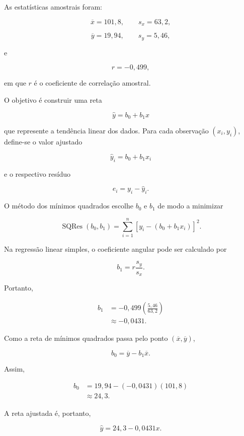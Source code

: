 \documentclass[
  letterpaper,
  DIV=11,
  numbers=noendperiod]{scrreprt}
\begin{document}
As estatísticas amostrais foram:

\[\overline{x}=101{,}8,
\qquad
s_x=63{,}2,\]

\[\overline{y}=19{,}94,
\qquad
s_y=5{,}46,\]

e

\[r=-0{,}499,\]

em que \(r\) é o coeficiente de correlação amostral.

O objetivo é construir uma reta

\[\widehat y=b_0+b_1x\]

que represente a tendência linear dos dados. Para cada observação
\((x_i,y_i)\), define-se o valor ajustado

\[\widehat y_i=b_0+b_1x_i\]

e o respectivo resíduo

\[e_i
=
y_i-\widehat y_i.\]

O método dos mínimos quadrados escolhe \(b_0\) e \(b_1\) de modo a
minimizar

\[\operatorname{SQRes}(b_0,b_1)
=
\sum_{i=1}^n
\left[
y_i-(b_0+b_1x_i)
\right]^2.\]

Na regressão linear simples, o coeficiente angular pode ser calculado
por

\[b_1
=
r\frac{s_y}{s_x}.\]

Portanto,

\[\begin{aligned}
b_1
&=
-0{,}499
\left(
\frac{5{,}46}{63{,}2}
\right)\\
&\approx
-0{,}0431.
\end{aligned}\]

Como a reta de mínimos quadrados passa pelo ponto
\((\overline{x},\overline{y})\),

\[b_0
=
\overline y-b_1\overline x.\]

Assim,

\[\begin{aligned}
b_0
&=
19{,}94
-
(-0{,}0431)(101{,}8)\\
&\approx
24{,}3.
\end{aligned}\]

A reta ajustada é, portanto,

\[\widehat y
=
24{,}3-0{,}0431x.\]
\end{document}
